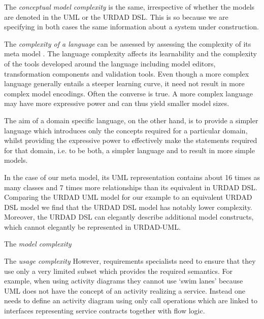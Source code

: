 The \emph{conceptual model complexity} is the same, irrespective  of whether the models are denoted in the UML or the URDAD DSL. This is so because we are specifying in both cases the same information about a system under construction.

The \emph{complexity of a language} can be assessed by assessing the complexity of its meta model \cite{mohagheghi_evaluating_2007}. The language complexity affects its learnability and the complexity  of the tools developed around the language including model editors, transformation components and validation tools. Even though a more complex language generally entails a steeper learning curve, it need not result in more complex model encodings. Often the converse is true. A more complex language may have more expressive power and can thus yield smaller model sizes. 

The aim of a domain specific language, on the other hand, is to provide a simpler language which introduces only the concepts required for a particular domain, whilst providing the expressive power to effectively make the statements required for that domain, i.e. to be both, a simpler language and to result in more simple models.

In the case of our meta model, its UML representation contains about 16 times as many classes and 7 times more relationships than its equivalent in URDAD DSL. Comparing the URDAD UML model for our example to an equivalent URDAD DSL model we find that the URDAD DSL model has notably lower complexity. Moreover, the URDAD DSL can elegantly describe additional model constructs, which cannot elegantly be represented in URDAD-UML.

The \emph{model complexity} 

The \emph{usage complexity}  However, requirements specialists need to ensure that they use only a very limited subset which provides the required semantics. For example, when using activity diagrams they cannot use `swim lanes' because UML does not have the concept of an activity realizing a service. Instead one needs to define an activity diagram using only call operations which are linked to interfaces representing service contracts together with flow logic.
